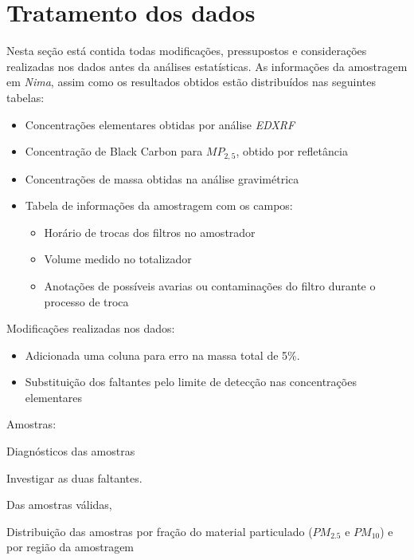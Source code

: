 \section{Tratamento dos dados}

Nesta seção está contida todas modificações, pressupostos e considerações 
realizadas nos dados antes da análises estatísticas.
As informações da amostragem em \textit{Nima}, assim como os resultados obtidos
 estão distribuídos nas seguintes tabelas: 

\begin{itemize}
  \item Concentrações elementares obtidas por análise \textit{EDXRF}
  \item Concentração de Black Carbon para $MP_{2,5}$, obtido por refletância
  \item Concentrações de massa obtidas na análise gravimétrica  
  \item Tabela de informações da amostragem com os campos:
  \begin{itemize}
    \item Horário de trocas dos filtros no amostrador
    \item Volume medido no totalizador
    \item Anotações de possíveis avarias ou contaminações do filtro
          durante o processo de troca
  \end{itemize}
\end{itemize}

Modificações realizadas nos dados:
\begin{itemize}
\item Adicionada uma coluna para erro na massa total de 5\%.
\item Substituição dos faltantes pelo limite de detecção nas 
      concentrações elementares
\end{itemize}

Amostras:
\begin{table}[H]
  \centering
  
  \caption{Diagnósticos das amostras}
\end{table}

Investigar as duas faltantes.

Das amostras válidas, 
\begin{table}[H]
  \centering
  
  \caption{Distribuição das amostras por fração do material particulado 
  ($PM_{2.5}$ e $PM_{10}$) e por região da amostragem}
\end{table}

